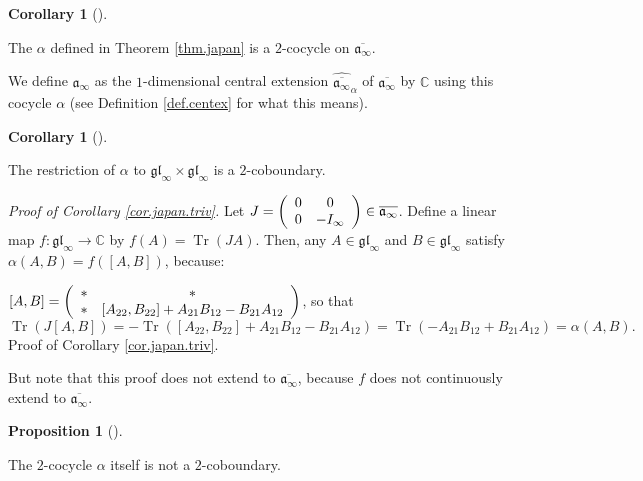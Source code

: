 \documentclass
[numbers=enddot,12pt,final,onecolumn,german,notitlepage]{scrartcl}%
\theoremstyle{definition}
\newtheorem{prop}[theo]{Proposition}
\newenvironment{proposition}[1][]
{\begin{prop}[#1]\begin{leftbar}}
{\end{leftbar}\end{prop}}
\newtheorem{coro}[theo]{Corollary}
\newenvironment{corollary}[1][]
{\begin{coro}[#1]\begin{leftbar}}
{\end{leftbar}\end{coro}}
\begin{document}
\begin{corollary}
The $\alpha$ defined in Theorem \ref{thm.japan} is a $2$-cocycle on
$\overline{\mathfrak{a}_{\infty}}$.

We define $\mathfrak{a}_{\infty}$ as the $1$-dimensional central extension
$\widehat{\overline{\mathfrak{a}_{\infty}}}_{\alpha}$ of $\overline
{\mathfrak{a}_{\infty}}$ by $\mathbb{C}$ using this cocycle $\alpha$ (see
Definition \ref{def.centex} for what this means).
\end{corollary}

\begin{corollary}
\label{cor.japan.triv}The restriction of $\alpha$ to $\mathfrak{gl}_{\infty
}\times\mathfrak{gl}_{\infty}$ is a $2$-coboundary.
\end{corollary}

\textit{Proof of Corollary \ref{cor.japan.triv}.} Let $J=\left(
\begin{array}
[c]{cc}%
0 & 0\\
0 & -I_{\infty}%
\end{array}
\right)  \in\overline{\mathfrak{a}_{\infty}}$. Define a linear map
$f:\mathfrak{gl}_{\infty}\rightarrow\mathbb{C}$ by $f\left(  A\right)
=\operatorname*{Tr}\left(  JA\right)  $. Then, any $A\in\mathfrak{gl}_{\infty
}$ and $B\in\mathfrak{gl}_{\infty}$ satisfy $\alpha\left(  A,B\right)
=f\left(  \left[  A,B\right]  \right)  $, because:

$\left[  A,B\right]  =\left(
\begin{array}
[c]{cc}%
\ast & \ast\\
\ast & \left[  A_{22},B_{22}\right]  +A_{21}B_{12}-B_{21}A_{12}%
\end{array}
\right)  $, so that
\[
\operatorname*{Tr}\left(  J\left[  A,B\right]  \right)  =-\operatorname*{Tr}%
\left(  \left[  A_{22},B_{22}\right]  +A_{21}B_{12}-B_{21}A_{12}\right)
=\operatorname*{Tr}\left(  -A_{21}B_{12}+B_{21}A_{12}\right)  =\alpha\left(
A,B\right)  .
\]
Proof of Corollary \ref{cor.japan.triv}.

But note that this proof does not extend to $\overline{\mathfrak{a}_{\infty}}%
$, because $f$ does not continuously extend to $\overline{\mathfrak{a}%
_{\infty}}$.

\begin{proposition}
\label{prop.japan.nontr}The $2$-cocycle $\alpha$ itself is not a $2$-coboundary.
\end{proposition}
\end{document}
